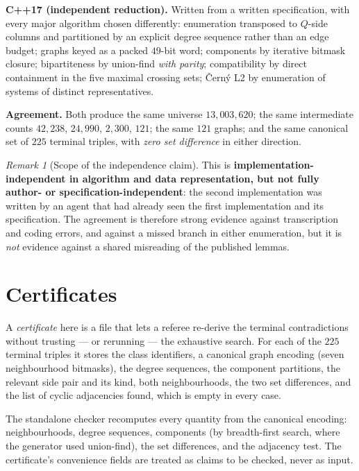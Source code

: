 \documentclass[11pt,a4paper]{article}
\theoremstyle{plain}
\theoremstyle{definition}
\theoremstyle{remark}
\newtheorem*{remark}{Remark}
\begin{document}
\textbf{C++17 (independent reduction).} Written from a written specification,
with every major algorithm chosen differently: enumeration transposed to
$Q$-side columns and partitioned by an explicit degree sequence rather than an
edge budget; graphs keyed as a packed $49$-bit word; components by iterative
bitmask closure; bipartiteness by union-find \emph{with parity}; compatibility by
direct containment in the five maximal crossing sets; {\v C}ern{\'y} L2 by
enumeration of systems of distinct representatives.

\textbf{Agreement.} Both produce the same universe $13{,}003{,}620$; the same
intermediate counts $42{,}238$, $24{,}990$, $2{,}300$, $121$; the same $121$
graphs; and the same canonical set of $225$ terminal triples, with
\emph{zero set difference} in either direction.

\begin{remark}[Scope of the independence claim]
This is \textbf{implementation-independent in algorithm and data representation,
but not fully author- or specification-independent}: the second implementation
was written by an agent that had already seen the first implementation and its
specification. The agreement is therefore strong evidence against transcription
and coding errors, and against a missed branch in either enumeration, but it is
\emph{not} evidence against a shared misreading of the published lemmas.
\end{remark}

\section{Certificates}\label{sec:cert}

A \emph{certificate} here is a file that lets a referee re-derive the terminal
contradictions without trusting --- or rerunning --- the exhaustive search. For
each of the $225$ terminal triples it stores the class identifiers, a canonical
graph encoding (seven neighbourhood bitmasks), the degree sequences, the
component partitions, the relevant side pair and its kind, both neighbourhoods,
the two set differences, and the list of cyclic adjacencies found, which is empty
in every case.

The standalone checker recomputes every quantity from the canonical encoding:
neighbourhoods, degree sequences, components (by breadth-first search, where the
generator used union-find), the set differences, and the adjacency test. The
certificate's convenience fields are treated as claims to be checked, never as
input.
\end{document}
